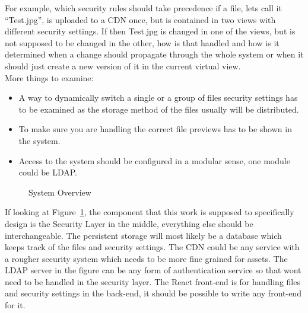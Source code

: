 \documentclass[a4paper,12pt]{article}
\begin{document}
For example, which security rules should take precedence if a file, lets call it 
``Test.jpg'', is uploaded to a CDN once, but is contained in two views 
with different security settings. If then Test.jpg is changed in one of the views, 
but is not supposed to be changed in the other, how is that handled and how is 
it determined when a change should propagate through the whole system or when it 
should just create a new version of it in the current virtual view.
\vspace{12pt}
\\
More things to examine:
\begin{itemize}
    \item A way to dynamically switch a single or a group of files security settings has 
to be examined as the storage method of the files usually will be distributed.
    \item To make sure you are handling the correct file previews has to be shown in the system.
    \item Access to the system should be configured in a modular sense, one module could be 
LDAP.
\end{itemize}

\begin{figure}[htp] 
    \caption{System Overview}
    \label{fig:overview}
\end{figure}
If looking at Figure~\ref{fig:overview}, the component that this work is supposed to specifically 
design is the Security Layer in the middle, everything else should be interchangeable. The persistent 
storage will most likely be a database which keeps track of the files and security settings. 
The CDN could be any service with a rougher security system which needs to be more 
fine grained for assets. The LDAP server in the figure can be any form of authentication service so that 
wont need to be handled in the security layer. The React front-end is for handling files and 
security settings in the back-end, it should be possible to write any front-end for it.
\end{document}
